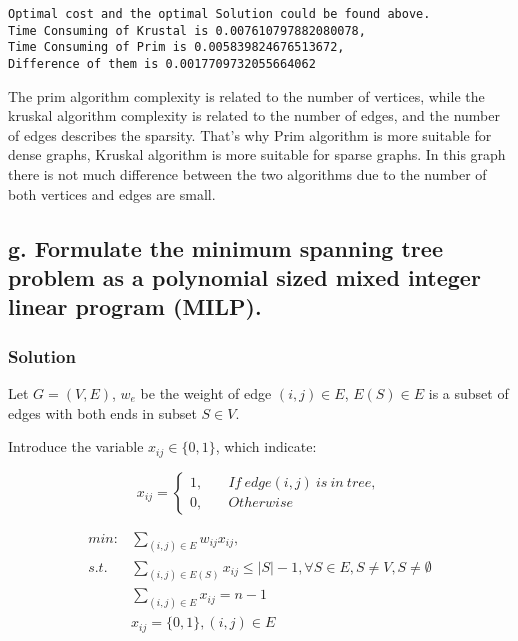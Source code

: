\documentclass[11pt]{article}
\begin{document}
    \begin{Verbatim}[commandchars=\\\{\}]
Optimal cost and the optimal Solution could be found above.
Time Consuming of Krustal is 0.007610797882080078,
Time Consuming of Prim is 0.005839824676513672,
Difference of them is 0.0017709732055664062
    \end{Verbatim}

    The prim algorithm complexity is related to the number of vertices,
while the kruskal algorithm complexity is related to the number of
edges, and the number of edges describes the sparsity. That's why Prim
algorithm is more suitable for dense graphs, Kruskal algorithm is more
suitable for sparse graphs. In this graph there is not much difference
between the two algorithms due to the number of both vertices and edges
are small.

    \hypertarget{g.-formulate-the-minimum-spanning-tree-problem-as-a-polynomial-sized-mixed-integer-linear-program-milp.}{%
\subsection{g. Formulate the minimum spanning tree problem as a
polynomial sized mixed integer linear program
(MILP).}\label{g.-formulate-the-minimum-spanning-tree-problem-as-a-polynomial-sized-mixed-integer-linear-program-milp.}}

\hypertarget{solution}{%
\subsubsection{Solution}\label{solution}}

Let \(G = (V,E)\), \(w_e\) be the weight of edge \((i,j) \in E\),
\(E(S) \in E\) is a subset of edges with both ends in subset
\(S \in V\).

Introduce the variable \(x_{ij} \in \{0,1 \}\), which indicate:

\[x_{ij}=\begin{cases}1,\quad &If\ edge(i, j)\ is\ in\ tree, \\ 0, &Otherwise \end{cases}\]

\[\begin{align*}
min: &\sum_{(i,j) \in E} w_{ij} x_{ij}, \\
s.t. &\sum_{(i,j) \in E(S)} x_{ij} \leq |S| - 1, \forall S \in E,S\neq V, S\neq \emptyset\\
&\sum_{(i,j) \in E} x_{ij} = n- 1 \\
&x_{ij} = \{0,1\}, (i,j) \in E
\end{align*}\]
\end{document}
